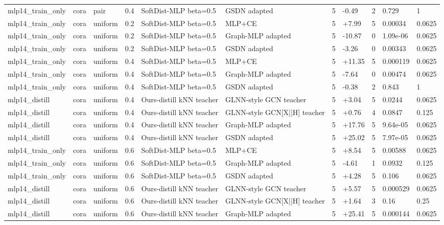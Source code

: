 \begin{table}[t]
\begin{tabular}{llllllrlrll}
mlp14_train_only & cora & pair & 0.4 & SoftDist-MLP beta=0.5 & GSDN adapted & 5 & -0.49 & 2 & 0.729 & 1 \\
mlp14_train_only & cora & uniform & 0.2 & SoftDist-MLP beta=0.5 & MLP+CE & 5 & +7.99 & 5 & 0.00034 & 0.0625 \\
mlp14_train_only & cora & uniform & 0.2 & SoftDist-MLP beta=0.5 & Graph-MLP adapted & 5 & -10.87 & 0 & 1.09e-06 & 0.0625 \\
mlp14_train_only & cora & uniform & 0.2 & SoftDist-MLP beta=0.5 & GSDN adapted & 5 & -3.26 & 0 & 0.00343 & 0.0625 \\
mlp14_train_only & cora & uniform & 0.4 & SoftDist-MLP beta=0.5 & MLP+CE & 5 & +11.35 & 5 & 0.000119 & 0.0625 \\
mlp14_train_only & cora & uniform & 0.4 & SoftDist-MLP beta=0.5 & Graph-MLP adapted & 5 & -7.64 & 0 & 0.00474 & 0.0625 \\
mlp14_train_only & cora & uniform & 0.4 & SoftDist-MLP beta=0.5 & GSDN adapted & 5 & -0.38 & 2 & 0.843 & 1 \\
mlp14_distill & cora & uniform & 0.4 & Ours-distill kNN teacher & GLNN-style GCN teacher & 5 & +3.04 & 5 & 0.0244 & 0.0625 \\
mlp14_distill & cora & uniform & 0.4 & Ours-distill kNN teacher & GLNN-style GCN[X||H] teacher & 5 & +0.76 & 4 & 0.0847 & 0.125 \\
mlp14_distill & cora & uniform & 0.4 & Ours-distill kNN teacher & Graph-MLP adapted & 5 & +17.76 & 5 & 9.64e-05 & 0.0625 \\
mlp14_distill & cora & uniform & 0.4 & Ours-distill kNN teacher & GSDN adapted & 5 & +25.02 & 5 & 7.97e-05 & 0.0625 \\
mlp14_train_only & cora & uniform & 0.6 & SoftDist-MLP beta=0.5 & MLP+CE & 5 & +8.54 & 5 & 0.00588 & 0.0625 \\
mlp14_train_only & cora & uniform & 0.6 & SoftDist-MLP beta=0.5 & Graph-MLP adapted & 5 & -4.61 & 1 & 0.0932 & 0.125 \\
mlp14_train_only & cora & uniform & 0.6 & SoftDist-MLP beta=0.5 & GSDN adapted & 5 & +4.28 & 5 & 0.106 & 0.0625 \\
mlp14_distill & cora & uniform & 0.6 & Ours-distill kNN teacher & GLNN-style GCN teacher & 5 & +5.57 & 5 & 0.000529 & 0.0625 \\
mlp14_distill & cora & uniform & 0.6 & Ours-distill kNN teacher & GLNN-style GCN[X||H] teacher & 5 & +1.64 & 3 & 0.16 & 0.25 \\
mlp14_distill & cora & uniform & 0.6 & Ours-distill kNN teacher & Graph-MLP adapted & 5 & +25.41 & 5 & 0.000144 & 0.0625 \\

\end{tabular}
\end{table}
